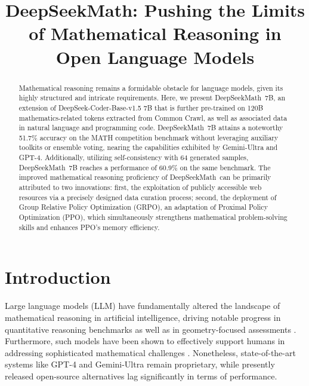 \title{DeepSeekMath: Pushing the Limits of Mathematical Reasoning in Open Language Models}

\begin{abstract}
Mathematical reasoning remains a formidable obstacle for language models, given its highly structured and intricate requirements. Here, we present DeepSeekMath~7B, an extension of DeepSeek-Coder-Base-v1.5 7B that is further pre-trained on 120B mathematics-related tokens extracted from Common Crawl, as well as associated data in natural language and programming code. DeepSeekMath~7B attains a noteworthy 51.7\% accuracy on the MATH competition benchmark without leveraging auxiliary toolkits or ensemble voting, nearing the capabilities exhibited by Gemini-Ultra and GPT-4. Additionally, utilizing self-consistency with 64 generated samples, DeepSeekMath~7B reaches a performance of 60.9\% on the same benchmark. The improved mathematical reasoning proficiency of DeepSeekMath~can be primarily attributed to two innovations: first, the exploitation of publicly accessible web resources via a precisely designed data curation process; second, the deployment of Group Relative Policy Optimization (GRPO), an adaptation of Proximal Policy Optimization (PPO), which simultaneously strengthens mathematical problem-solving skills and enhances PPO’s memory efficiency.
\end{abstract}

\section{Introduction}

Large language models (LLM) have fundamentally altered the landscape of mathematical reasoning in artificial intelligence, driving notable progress in quantitative reasoning benchmarks \citep{MATH} as well as in geometry-focused assessments \citep{trinh2024solving}. Furthermore, such models have been shown to effectively support humans in addressing sophisticated mathematical challenges \citep{tao}. Nonetheless, state-of-the-art systems like GPT-4 \citep{gpt4} and Gemini-Ultra \citep{gemini} remain proprietary, while presently released open-source alternatives lag significantly in terms of performance.

